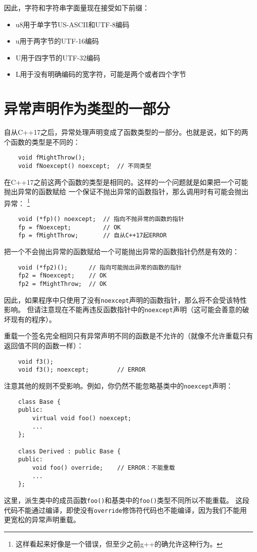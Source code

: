 因此，字符和字符串字面量现在接受如下前缀：
\begin{itemize}
    \item u8用于单字节US-ASCII和UTF-8编码
    \item u用于两字节的UTF-16编码
    \item U用于四字节的UTF-32编码
    \item L用于没有明确编码的宽字符，可能是两个或者四个字节
\end{itemize}

\section{异常声明作为类型的一部分}\label{ch8.7}
自从C++17之后，异常处理声明变成了函数类型的一部分。也就是说，如下的两个函数的类型是不同的：
\begin{lstlisting}
    void fMightThrow();
    void fNoexcept() noexcept;  // 不同类型
\end{lstlisting}
在C++17之前这两个函数的类型是相同的。这样的一个问题就是如果把一个可能抛出异常的函数赋给
一个保证不抛出异常的函数指针，那么调用时有可能会抛出异常：
\footnote{这样看起来好像是一个错误，但至少之前g++的确允许这种行为。}
\begin{lstlisting}
    void (*fp)() noexcept;  // 指向不抛异常的函数的指针
    fp = fNoexcept;         // OK
    fp = fMightThrow;       // 自从C++17起ERROR
\end{lstlisting}
把一个不会抛出异常的函数赋给一个可能抛出异常的函数指针仍然是有效的：
\begin{lstlisting}
    void (*fp2)();      // 指向可能抛出异常的函数的指针
    fp2 = fNoexcept;    // OK
    fp2 = fMightThrow;  // OK
\end{lstlisting}
因此，如果程序中只使用了没有\texttt{noexcept}声明的函数指针，那么将不会受该特性影响。
但请注意现在不能再违反函数指针中的\texttt{noexcept}声明（这可能会善意的破坏现有的程序）。

重载一个签名完全相同只有异常声明不同的函数是不允许的（就像不允许重载只有返回值不同的函数一样）：
\begin{lstlisting}
    void f3();
    void f3(); noexcept;        // ERROR
\end{lstlisting}
注意其他的规则不受影响。例如，你仍然不能忽略基类中的\texttt{noexcept}声明：
\begin{lstlisting}
    class Base {
    public:
        virtual void foo() noexcept;
        ...
    };

    class Derived : public Base {
    public:
        void foo() override;    // ERROR：不能重载
        ...
    };
\end{lstlisting}
这里，派生类中的成员函数\texttt{foo()}和基类中的\texttt{foo()}类型不同所以不能重载。
这段代码不能通过编译，即使没有\texttt{override}修饰符代码也不能编译，因为我们不能用
更宽松的异常声明重载。

